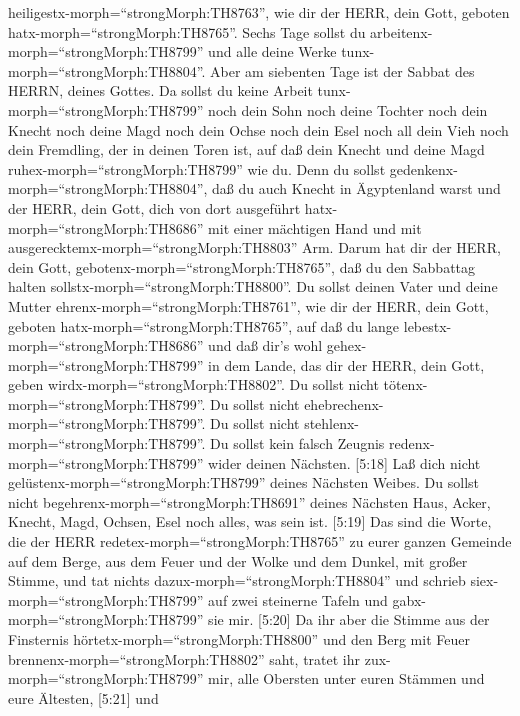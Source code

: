 heiligestx-morph=``strongMorph:TH8763'', wie dir der HERR, dein Gott,
geboten hatx-morph=``strongMorph:TH8765''.  Sechs Tage
sollst du arbeitenx-morph=``strongMorph:TH8799'' und alle deine Werke
tunx-morph=``strongMorph:TH8804''.  Aber am siebenten Tage
ist der Sabbat des HERRN, deines Gottes. Da sollst du keine Arbeit
tunx-morph=``strongMorph:TH8799'' noch dein Sohn noch deine Tochter noch
dein Knecht noch deine Magd noch dein Ochse noch dein Esel noch all dein
Vieh noch dein Fremdling, der in deinen Toren ist, auf daß dein Knecht
und deine Magd ruhex-morph=``strongMorph:TH8799'' wie du. 
Denn du sollst gedenkenx-morph=``strongMorph:TH8804'', daß du auch
Knecht in Ägyptenland warst und der HERR, dein Gott, dich von dort
ausgeführt hatx-morph=``strongMorph:TH8686'' mit einer mächtigen Hand
und mit ausgerecktemx-morph=``strongMorph:TH8803'' Arm. Darum hat dir
der HERR, dein Gott, gebotenx-morph=``strongMorph:TH8765'', daß du den
Sabbattag halten sollstx-morph=``strongMorph:TH8800''.  Du
sollst deinen Vater und deine Mutter
ehrenx-morph=``strongMorph:TH8761'', wie dir der HERR, dein Gott,
geboten hatx-morph=``strongMorph:TH8765'', auf daß du lange
lebestx-morph=``strongMorph:TH8686'' und daß dir's wohl
gehex-morph=``strongMorph:TH8799'' in dem Lande, das dir der HERR, dein
Gott, geben wirdx-morph=``strongMorph:TH8802''.  Du sollst
nicht tötenx-morph=``strongMorph:TH8799''.  Du sollst nicht
ehebrechenx-morph=``strongMorph:TH8799''.  Du sollst nicht
stehlenx-morph=``strongMorph:TH8799''.  Du sollst kein
falsch Zeugnis redenx-morph=``strongMorph:TH8799'' wider deinen
Nächsten.  {[}5:18{]} Laß dich nicht
gelüstenx-morph=``strongMorph:TH8799'' deines Nächsten Weibes. Du sollst
nicht begehrenx-morph=``strongMorph:TH8691'' deines Nächsten Haus,
Acker, Knecht, Magd, Ochsen, Esel noch alles, was sein ist.
 {[}5:19{]} Das sind die Worte, die der HERR
redetex-morph=``strongMorph:TH8765'' zu eurer ganzen Gemeinde auf dem
Berge, aus dem Feuer und der Wolke und dem Dunkel, mit großer Stimme,
und tat nichts dazux-morph=``strongMorph:TH8804'' und schrieb
siex-morph=``strongMorph:TH8799'' auf zwei steinerne Tafeln und
gabx-morph=``strongMorph:TH8799'' sie mir.  {[}5:20{]} Da
ihr aber die Stimme aus der Finsternis
hörtetx-morph=``strongMorph:TH8800'' und den Berg mit Feuer
brennenx-morph=``strongMorph:TH8802'' saht, tratet ihr
zux-morph=``strongMorph:TH8799'' mir, alle Obersten unter euren Stämmen
und eure Ältesten,  {[}5:21{]} und
